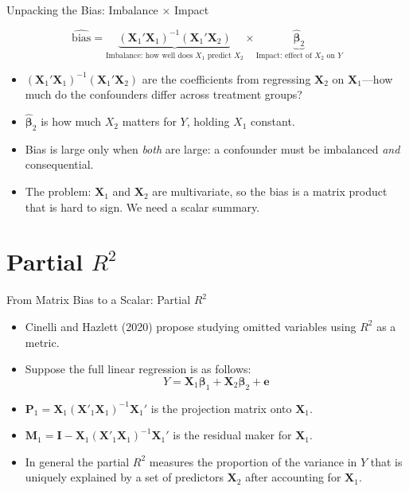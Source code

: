 \documentclass[aspectratio=169, handout, t]{beamer}
\numberwithin{equation}{section}
\begin{document}
\begin{frame}{Unpacking the Bias: Imbalance $\times$ Impact}

$$\widehat{\text{bias}} = \underbrace{(\bm{X}_1'\bm{X}_1)^{-1}(\bm{X}_1'\bm{X}_2)}_{\text{Imbalance: how well does }X_1\text{ predict }X_2}\times\underbrace{\bm{\hat{\beta}}_2}_{\text{Impact: effect of }X_2\text{ on }Y}$$
\begin{itemize}
\item $(\bm{X}_1'\bm{X}_1)^{-1}(\bm{X}_1'\bm{X}_2)$ are the coefficients from regressing $\bm{X}_2$ on $\bm{X}_1$---how much do the confounders differ across treatment groups?\pause
\item $\bm{\hat{\beta}}_2$ is how much $X_2$ matters for $Y$, holding $X_1$ constant.\pause
\item Bias is large only when \emph{both} are large: a confounder must be imbalanced \emph{and} consequential.\pause
\item The problem: $\bm{X}_1$ and $\bm{X}_2$ are multivariate, so the bias is a matrix product that is hard to sign. We need a scalar summary.
\end{itemize}
\end{frame}

\section{Partial $R^2$}

\begin{frame}{From Matrix Bias to a Scalar: Partial $R^2$}
\begin{itemize}
\item Cinelli and Hazlett (2020) propose studying omitted variables using $R^2$ as a metric.
\item Suppose the full linear regression is as follows:
$$Y=\bm{X}_1\bm{\beta}_1+\bm{X}_2\bm{\beta}_2+\bm{e}$$
\item $\bm{P}_1=\bm{X}_1(\bm{X}'_1\bm{X}_1)^{-1}\bm{X}_1'$ is the projection matrix onto $\bm{X}_1$.
\item $\bm{M}_1=\bm{I}-\bm{X}_1(\bm{X}'_1\bm{X}_1)^{-1}\bm{X}_1'$ is the residual maker for $\bm{X}_1$.
\item In general the partial $R^2$ measures the proportion of the variance in $Y$ that is uniquely explained by a set of predictors $\bm{X}_2$ after accounting for $\bm{X}_1$.
\end{itemize}
\end{frame}
\end{document}
